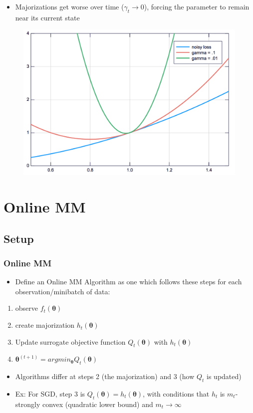 \documentclass{beamer}
\newcommand{\iter}[2]{#1^{(#2)}}
\begin{document}
\begin{frame}
  \begin{itemize}
    \item Majorizations get worse over time ($\gamma_t \rightarrow 0$), forcing the parameter to remain near its current state
  \end{itemize}
  \begin{figure}
    \includegraphics[width=.7\textwidth]{figures/quadraticupperbound.png}
  \end{figure}
\end{frame}



\section{Online MM}
\subsection{Setup}
\begin{frame}
  \frametitle{Online MM}
  \begin{itemize}
    \item Define an Online MM Algorithm as one which follows these steps for each observation/minibatch of data:
  \end{itemize}
  \begin{enumerate}
    \item observe $f_t(\bm\theta)$
    \item create majorization $h_t(\bm\theta)$
    \item Update surrogate objective function $Q_t(\bm\theta)$ with $h_t(\bm\theta)$
    \item $\iter{\bm\theta}{t+1} = argmin_{\bm\theta}Q_t(\bm\theta)$
  \end{enumerate}
\end{frame}
\begin{frame}
  \begin{itemize}
    \item Algorithms differ at steps 2 (the majorization) and 3 (how $Q_t$ is updated)
    \item Ex: For SGD, step 3 is $Q_t(\bm\theta) = h_t(\bm\theta)$, with conditions that $h_t$ is $m_t$-strongly convex (quadratic lower bound) and $m_t\rightarrow\infty$
  \end{itemize}
\end{frame}
\end{document}
